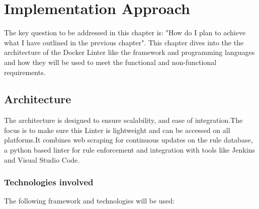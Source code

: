\chapter{Implementation Approach}
\label{chap:implementation}
The key question to be addressed in this chapter is: "How do I plan to achieve what I have outlined in the previous chapter".
This chapter dives into the the architecture of the Docker Linter like the framework and programming languages and how they will be used to meet the functional and non-functional requirements. 


\section{Architecture} \label{sec:Arch}
The architecture is designed to ensure scalability, and ease of integration.The focus is to make sure this Linter is lightweight and can be accessed on all platforms.It combines web scraping for continuous updates on the rule database, a python based linter for rule enforcement and integration with tools like Jenkins and Visual Studio Code. 
\subsection{Technologies involved}
The following framework and technologies will be used: 
